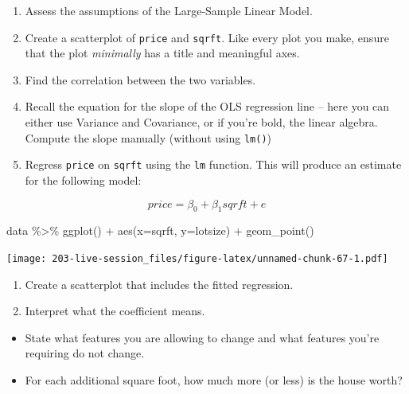 \documentclass[
]{book}
\newenvironment{Shaded}{\begin{snugshade}}{\end{snugshade}}
\newcommand{\AttributeTok}[1]{\textcolor[rgb]{0.77,0.63,0.00}{#1}}
\newcommand{\FunctionTok}[1]{\textcolor[rgb]{0.00,0.00,0.00}{#1}}
\newcommand{\NormalTok}[1]{#1}
\newcommand{\SpecialCharTok}[1]{\textcolor[rgb]{0.00,0.00,0.00}{#1}}
\providecommand{\tightlist}{%
  \setlength{\itemsep}{0pt}\setlength{\parskip}{0pt}}
\theoremstyle{definition}
\theoremstyle{definition}
\theoremstyle{definition}
\theoremstyle{definition}
\theoremstyle{remark}
\begin{document}
\begin{enumerate}
\def\labelenumi{\arabic{enumi}.}
\setcounter{enumi}{-1}
\item
  Assess the assumptions of the Large-Sample Linear Model.
\item
  Create a scatterplot of \texttt{price} and \texttt{sqrft}. Like every plot you make, ensure that the plot \emph{minimally} has a title and meaningful axes.
\item
  Find the correlation between the two variables.
\item
  Recall the equation for the slope of the OLS regression line -- here you can either use Variance and Covariance, or if you're bold, the linear algebra. Compute the slope manually (without using \texttt{lm()})
\item
  Regress \texttt{price} on \texttt{sqrft} using the \texttt{lm} function. This will produce an estimate for the following model:
\end{enumerate}

\[ 
  price = \beta_{0} + \beta_{1} sqrft + e
\]

\begin{Shaded}
\begin{Highlighting}[]
\NormalTok{data }\SpecialCharTok{\%\textgreater{}\%} 
  \FunctionTok{ggplot}\NormalTok{() }\SpecialCharTok{+} 
  \FunctionTok{aes}\NormalTok{(}\AttributeTok{x=}\NormalTok{sqrft, }\AttributeTok{y=}\NormalTok{lotsize) }\SpecialCharTok{+} 
  \FunctionTok{geom\_point}\NormalTok{()}
\end{Highlighting}
\end{Shaded}

\texttt{[image: 203-live-session\_files/figure-latex/unnamed-chunk-67-1.pdf]}

\begin{enumerate}
\def\labelenumi{\arabic{enumi}.}
\setcounter{enumi}{4}
\item
  Create a scatterplot that includes the fitted regression.
\item
  Interpret what the coefficient means.
\end{enumerate}

\begin{itemize}
\tightlist
\item
  State what features you are allowing to change and what features you're requiring do not change.
\item
  For each additional square foot, how much more (or less) is the house worth?
\end{itemize}
\end{document}
